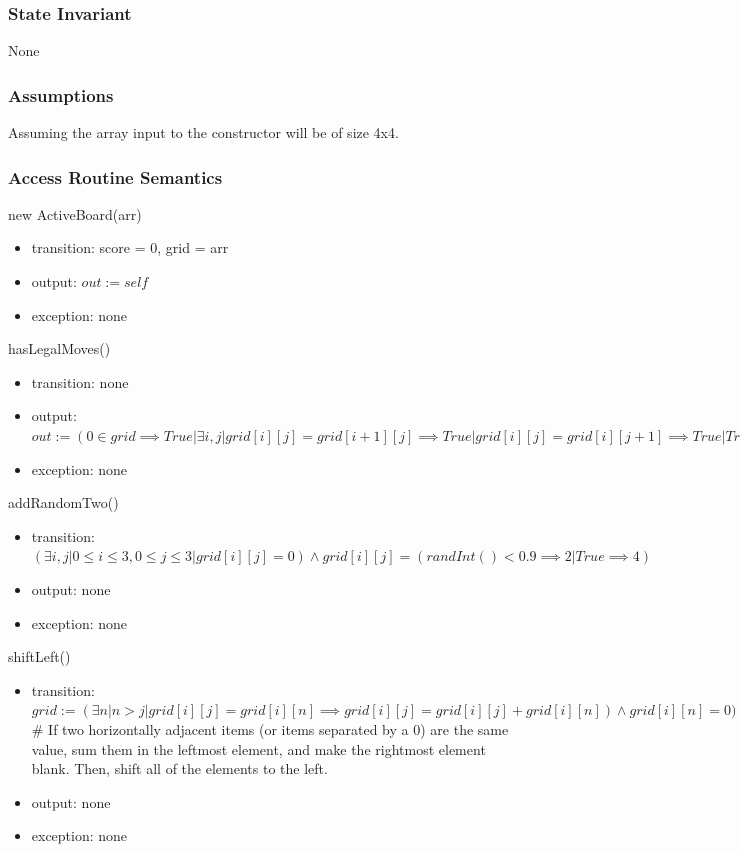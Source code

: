 \documentclass[12pt]{article}
\begin{document}
\subsubsection*{State Invariant}

None

\subsubsection*{Assumptions}

Assuming the array input to the constructor will be of size 4x4.

\subsubsection*{Access Routine Semantics}

\noindent new ActiveBoard(arr)
\begin{itemize}
    \item transition: score = 0, grid = arr
    \item output: $out := self$
    \item exception: none
\end{itemize}

\noindent hasLegalMoves()
\begin{itemize}
    \item transition: none
    \item output: $out := (0 \in grid \implies True| \exists i,j | grid[i][j] = grid[i+1][j] \implies True | grid[i][j] = grid[i][j+1] \implies True| True \implies False)$
    \item exception: none
\end{itemize}

\noindent addRandomTwo()
\begin{itemize}
    \item transition: $(\exists i,j | 0 \leq i \leq 3,0 \leq j \leq 3 | grid[i][j] = 0) \land grid[i][j] = (randInt() < 0.9 \implies 2 | True \implies 4)$
    \item output: none
    \item exception: none
\end{itemize}

\noindent shiftLeft()
\begin{itemize}
    \item transition: $grid := (\exists n | n > j|grid[i][j] = grid[i][n] \implies grid[i][j] = grid[i][j]+grid[i][n]) \land grid[i][n] = 0) \land (\exists m | m > j| grid[i][j] = 0 \land grid[i][m] \neq 0 \implies grid[i][j],grid[i][m] = grid[i][m],grid[i][j])$ \\
    \# If two horizontally adjacent items (or items separated by a 0) are the same value, sum them in the leftmost element, and make the rightmost element blank. Then, shift all of the elements to the left.
    \item output: none
    \item exception: none
\end{itemize}
\end{document}
